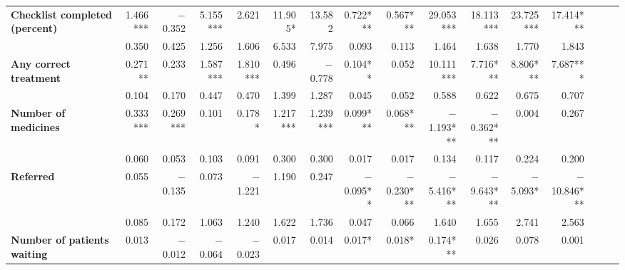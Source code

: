 \begin{tabular}{@{\extracolsep{5pt}}lrrrrrrrrrrrrrrr}
{\bf Checklist completed (percent)} & 1.466*** & $-$0.352\phantom{***} & 5.155*** & 2.621\phantom{***} & 11.905*\phantom{**} & 13.582\phantom{***} & 0.722*** & 0.567*** & 29.053*** & 18.113*** & 23.725*** & 17.414*** \\
{\bf } & 0.350\phantom{***} & 0.425\phantom{***} & 1.256\phantom{***} & 1.606\phantom{***} & 6.533\phantom{***} & 7.975\phantom{***} & 0.093\phantom{***} & 0.113\phantom{***} & 1.464\phantom{***} & 1.638\phantom{***} & 1.770\phantom{***} & 1.843\phantom{***} \\
{\bf Any correct treatment} & 0.271**\phantom{*} & 0.233\phantom{***} & 1.587*** & 1.810*** & 0.496\phantom{***} & $-$0.778\phantom{***} & 0.104**\phantom{*} & 0.052\phantom{***} & 10.111*** & 7.716*** & 8.806*** & 7.687*** \\
{\bf } & 0.104\phantom{***} & 0.170\phantom{***} & 0.447\phantom{***} & 0.470\phantom{***} & 1.399\phantom{***} & 1.287\phantom{***} & 0.045\phantom{***} & 0.052\phantom{***} & 0.588\phantom{***} & 0.622\phantom{***} & 0.675\phantom{***} & 0.707\phantom{***} \\
{\bf Number of medicines} & 0.333*** & 0.269*** & 0.101\phantom{***} & 0.178*\phantom{**} & 1.217*** & 1.239*** & 0.099*** & 0.068*** & $-$1.193*** & $-$0.362*** & 0.004\phantom{***} & 0.267\phantom{***} \\
{\bf } & 0.060\phantom{***} & 0.053\phantom{***} & 0.103\phantom{***} & 0.091\phantom{***} & 0.300\phantom{***} & 0.300\phantom{***} & 0.017\phantom{***} & 0.017\phantom{***} & 0.134\phantom{***} & 0.117\phantom{***} & 0.224\phantom{***} & 0.200\phantom{***} \\
{\bf Referred} & 0.055\phantom{***} & $-$0.135\phantom{***} & 0.073\phantom{***} & $-$1.221\phantom{***} & 1.190\phantom{***} & 0.247\phantom{***} & $-$0.095**\phantom{*} & $-$0.230*** & $-$5.416*** & $-$9.643*** & $-$5.093*\phantom{**} & $-$10.846*** \\
{\bf } & 0.085\phantom{***} & 0.172\phantom{***} & 1.063\phantom{***} & 1.240\phantom{***} & 1.622\phantom{***} & 1.736\phantom{***} & 0.047\phantom{***} & 0.066\phantom{***} & 1.640\phantom{***} & 1.655\phantom{***} & 2.741\phantom{***} & 2.563\phantom{***} \\
{\bf Number of patients waiting} & 0.013\phantom{***} & $-$0.012\phantom{***} & $-$0.064\phantom{***} & $-$0.023\phantom{***} & 0.017\phantom{***} & 0.014\phantom{***} & 0.017*\phantom{**} & 0.018*\phantom{**} & 0.174*** & 0.026\phantom{***} & 0.078\phantom{***} & 0.001\phantom{***} \\

\end{tabular}
